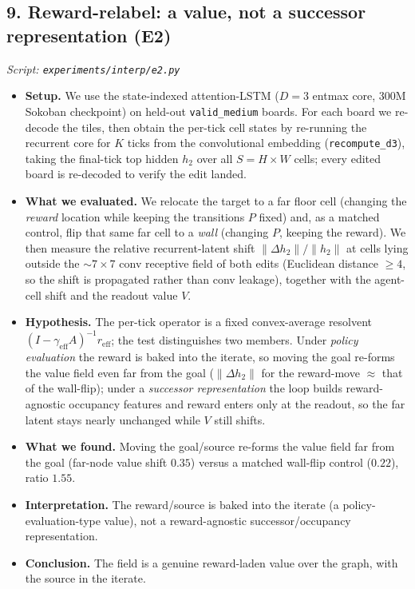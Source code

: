 \documentclass[11pt]{article}
\begin{document}
\subsection*{9. Reward-relabel: a value, not a successor representation (E2)}
\textit{Script: \texttt{experiments/interp/e2.py}}
\begin{itemize}
\item \textbf{Setup.} We use the state-indexed attention-LSTM ($D=3$ entmax core, $300$M Sokoban checkpoint) on held-out \texttt{valid\_medium} boards. For each board we re-decode the tiles, then obtain the per-tick cell states by re-running the recurrent core for $K$ ticks from the convolutional embedding (\texttt{recompute\_d3}), taking the final-tick top hidden $h_2$ over all $S=H\times W$ cells; every edited board is re-decoded to verify the edit landed.
\item \textbf{What we evaluated.} We relocate the target to a far floor cell (changing the \emph{reward} location while keeping the transitions $P$ fixed) and, as a matched control, flip that same far cell to a \emph{wall} (changing $P$, keeping the reward). We then measure the relative recurrent-latent shift $\lVert\Delta h_2\rVert/\lVert h_2\rVert$ at cells lying outside the $\sim 7\times7$ conv receptive field of both edits (Euclidean distance $\ge 4$, so the shift is propagated rather than conv leakage), together with the agent-cell shift and the readout value $V$.
\item \textbf{Hypothesis.} The per-tick operator is a fixed convex-average resolvent $(I-\gamma_{\text{eff}}A)^{-1}r_{\text{eff}}$; the test distinguishes two members. Under \emph{policy evaluation} the reward is baked into the iterate, so moving the goal re-forms the value field even far from the goal ($\lVert\Delta h_2\rVert$ for the reward-move $\approx$ that of the wall-flip); under a \emph{successor representation} the loop builds reward-agnostic occupancy features and reward enters only at the readout, so the far latent stays nearly unchanged while $V$ still shifts.
\item \textbf{What we found.} Moving the goal/source re-forms the value field far from the goal (far-node value shift $0.35$) versus a matched wall-flip control ($0.22$), ratio $1.55$.
\item \textbf{Interpretation.} The reward/source is baked into the iterate (a policy-evaluation-type value), not a reward-agnostic successor/occupancy representation.
\item \textbf{Conclusion.} The field is a genuine reward-laden value over the graph, with the source in the iterate.
\end{itemize}
\clearpage
\end{document}
